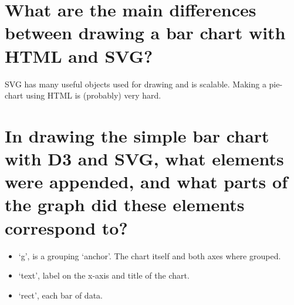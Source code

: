 \documentclass[a4paper]{scrartcl}
\begin{document}
\section{What are the main differences between drawing a bar chart with HTML and SVG?}
SVG has many useful objects used for drawing and is scalable. Making a pie-chart using HTML is (probably) very hard.

\section{In drawing the simple bar chart with D3 and SVG, what elements were appended, and what parts of the graph did these elements correspond to?}

\begin{itemize}
    \item `g', is a grouping `anchor'. The chart itself and both axes where grouped.
    \item `text', label on the x-axis and title of the chart. 
    \item `rect', each bar of data.
\end{itemize}
\end{document}
